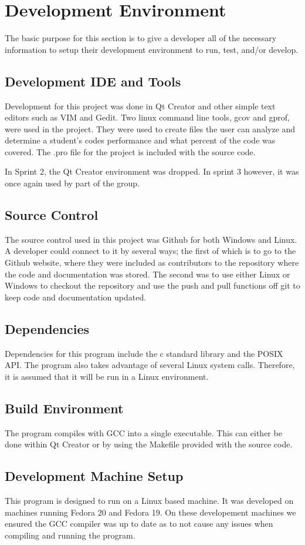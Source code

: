 \chapter{Development Environment}
The basic purpose for this section is to give a developer all of the necessary 
information to setup their development environment to run, test, and/or develop.

\section{Development IDE and Tools}
Development for this project was done in Qt Creator and other simple text editors such as VIM and Gedit. 
Two linux command line tools, gcov and gprof, were used in the project. They were used to create files the
user can analyze and determine a student's codes performance and what percent of the code was covered. 
The .pro file for the project is included with the source code.

In Sprint 2, the Qt Creator environment was dropped. In sprint 3 however, it was once again used by part 
of the group. 

\section{Source  Control}
The source control used in this project was Github for both Windows and Linux. A developer could connect 
to it by several ways; the first of which is to go to the Github website, where they were included as 
contributors to the repository where the code and documentation was stored. The second was to use either 
Linux or Windows to checkout the repository and use the push and pull functions off git to keep code and 
documentation updated.

\section{Dependencies}
Dependencies for this program include the c standard library and the POSIX API. The program also takes 
advantage of several Linux system calls. Therefore, it is assumed that it will be run in a Linux environment. 

\section{Build  Environment}
The program compiles with GCC into a single executable. This can either be done within Qt Creator or by using 
the Makefile provided with the source code. 

\section{Development Machine Setup}
This program is designed to run on a Linux based machine.
It was developed on machines running Fedora 20 and Fedora 19. On these developement machines we ensured the 
GCC compiler was up to date as to not cause any issues when compiling and running the program. 

